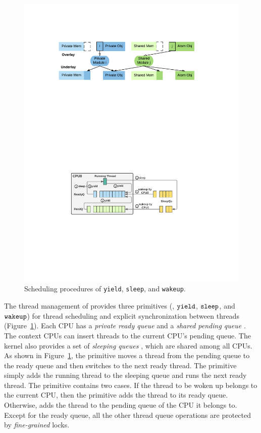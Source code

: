 {\begin{figure}[t]\centering
\includegraphics[scale=1.4]{figs/scheduler} 
\caption{Scheduling procedures of \texttt{yield}, \texttt{sleep},
and \texttt{wakeup}.}
\label{fig:exp:fig:scheduler}
\hrulefill
\end{figure}

The thread management of \cCTOS{}
provides three primitives
(\ie, ${\texttt{yield}}$, ${\texttt{sleep}}$, and ${\texttt{wakeup}}$)
for  thread scheduling and explicit synchronization between threads
(\cf Figure~\ref{fig:exp:fig:scheduler}). 
Each CPU has a \emph{private ready queue} 
and a \emph{shared pending queue} .
The context CPUs can insert threads to the current CPU's pending queue.
The {\cCTOS} kernel also provides a set of \emph{sleeping queues} , which are
shared among all CPUs.
As shown in Figure~\ref{fig:exp:fig:scheduler},
the  primitive moves a thread from
the pending queue to the ready queue
and then switches to the next ready thread.
The  primitive simply adds the running thread to the sleeping
queue and runs the next ready thread.
The  primitive contains two cases.
If the thread to be woken up belongs to the current CPU,
then the primitive adds the thread to its ready queue.
Otherwise,  adds the thread to the pending queue of the CPU it belongs to.
Except for the ready queue,
all the other thread queue operations are protected by \emph{fine-grained} locks.

}
